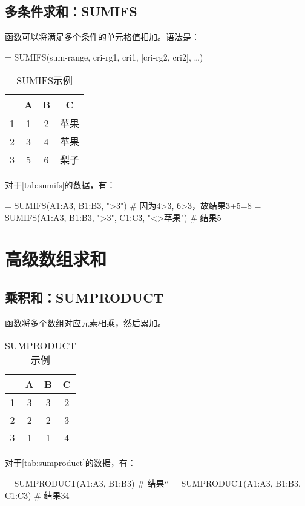 \subsection{多条件求和：SUMIFS}
函数可以将满足多个条件的单元格值相加。语法是：
\begin{syntax}
= SUMIFS(sum-range, cri-rg1, cri1, [cri-rg2, cri2], \ldots)
\end{syntax}

\begin{table}[!hbt]
    \centering
    \caption{SUMIFS示例}\label{tab:sumifs}
    \begin{tabular}{c|ccc}
    \hline
      & A & B & C \\
    \hline
    1 & 1 & 2 & 苹果\\
    2 & 3 & 4 & 苹果\\
    3 & 5 & 6 & 梨子\\
    \hline
    \end{tabular}
\end{table}

对于\autoref{tab:sumifs}的数据，有：
\begin{excode}
= SUMIFS(A1:A3, B1:B3, ">3")  # 因为4>3, 6>3，故结果3+5=8
= SUMIFS(A1:A3, B1:B3, ">3", C1:C3, "<>苹果")  # 结果5
\end{excode}

\section{高级数组求和}
\subsection{乘积和：SUMPRODUCT}
函数将多个数组对应元素相乘，然后累加。

\begin{table}[!hbt]
    \centering
    \caption{SUMPRODUCT示例}\label{tab:sumproduct}
    \begin{tabular}{c|ccc}
    \hline
      & A & B & C \\
    \hline
    1 & 3 & 3 & 2\\
    2 & 2 & 2 & 3\\
    3 & 1 & 1 & 4\\
    \hline
    \end{tabular}
\end{table}

对于\autoref{tab:sumproduct}的数据，有：
\begin{excode}
= SUMPRODUCT(A1:A3, B1:B3)  # 结果``
= SUMPRODUCT(A1:A3, B1:B3, C1:C3)  # 结果34
\end{excode}

